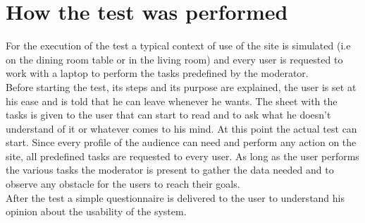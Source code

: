 \section{How the test was performed}
For the execution of the test a typical context of use of the site is simulated (i.e on the dining room table or in the living room) and every user is requested to work with a laptop to perform the tasks predefined by the moderator.\\
Before starting the test, its steps and its purpose are explained, the user is set at his ease and is told that he can leave whenever he wants.
The sheet with the tasks is given to the user that can start to read and to ask what he doesn't understand of it or whatever comes to his mind. At this point the actual test can start. Since every profile of the audience can need and perform any action on the site, all predefined tasks are requested to every user. As long as the user performs the various tasks the moderator is present to gather the data needed and to observe any obstacle for the users to reach their goals.\\
After the test a simple questionnaire is delivered to the user to understand his opinion about the usability of the system.

%
%
